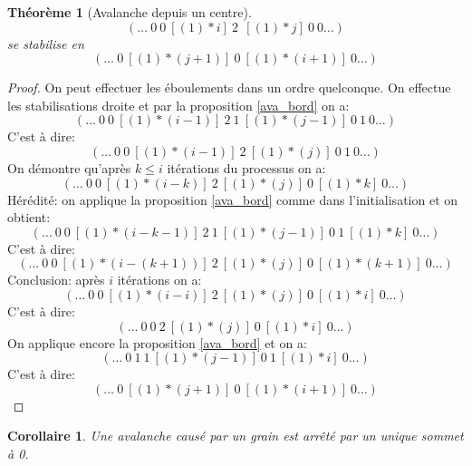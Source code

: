 \documentclass{report}
\newtheorem{theorem}{Théorème}[chapter]
\newtheorem{corollary}{Corollaire}[theorem]
\begin{document}
\begin{theorem}[Avalanche depuis un centre]\label{ava_centre}
$$(\hdots \ 0 \ 0 \ [(1) * i]\ 2\ \ [(1) * j]\ 0\ 0 \hdots)$$ 
se stabilise en
$$(\hdots \ 0 \ [(1) * (j+1)]\ 0 \ [(1) * (i+1)]\ 0 \hdots)$$
\end{theorem}
\begin{proof}
On peut effectuer les éboulements dans un ordre quelconque. On effectue les stabilisations droite et par la proposition \ref{ava_bord} on a:
$$(\hdots \ 0 \ 0 \ [(1) * (i - 1)]\ 2\ 1 \ [(1) * (j - 1)]\ 0\ 1\ 0 \hdots)$$
C'est à dire:
$$(\hdots \ 0 \ 0 \ [(1) * (i - 1)]\ 2\ [(1) * (j)]\ 0\ 1\ 0 \hdots)$$
On démontre qu'après $k \leq i$ itérations du processus on a:
$$(\hdots \ 0 \ 0 \ [(1) * (i - k)]\ 2\ [(1) * (j)]\ 0\ [(1) * k]\ 0 \hdots)$$
Hérédité: on applique la proposition \ref{ava_bord} comme dans l'initialisation et on obtient:
$$(\hdots \ 0 \ 0 \ [(1) * (i - k - 1)]\ 2\ 1\ [(1) * (j - 1)]\ 0\ 1\ [(1) * k]\ 0 \hdots)$$
C'est à dire:
$$(\hdots \ 0 \ 0 \ [(1) * (i - (k+1))]\ 2\ [(1) * (j)]\ 0\ [(1) * (k+1)]\ 0 \hdots)$$
Conclusion:
après $i$ itérations on a:
$$(\hdots \ 0 \ 0 \ [(1) * (i - i)]\ 2\ [(1) * (j)]\ 0\ [(1) * i]\ 0 \hdots)$$
C'est à dire:
$$(\hdots \ 0 \ 0\ 2\ [(1) * (j)]\ 0\ [(1) * i]\ 0 \hdots)$$
On applique encore la proposition \ref{ava_bord} et on a:
$$(\hdots \ 0 \ 1\ 1\ [(1) * (j-1)]\ 0 \ 1\ [(1) * i]\ 0 \hdots)$$
C'est à dire:
$$(\hdots \ 0 \ [(1) * (j+1)]\ 0 \ [(1) * (i+1)]\ 0 \hdots)$$
\end{proof}


\begin{corollary}
Une avalanche causé par un grain est arrêté par un unique sommet à 0.
\end{corollary}
\end{document}
